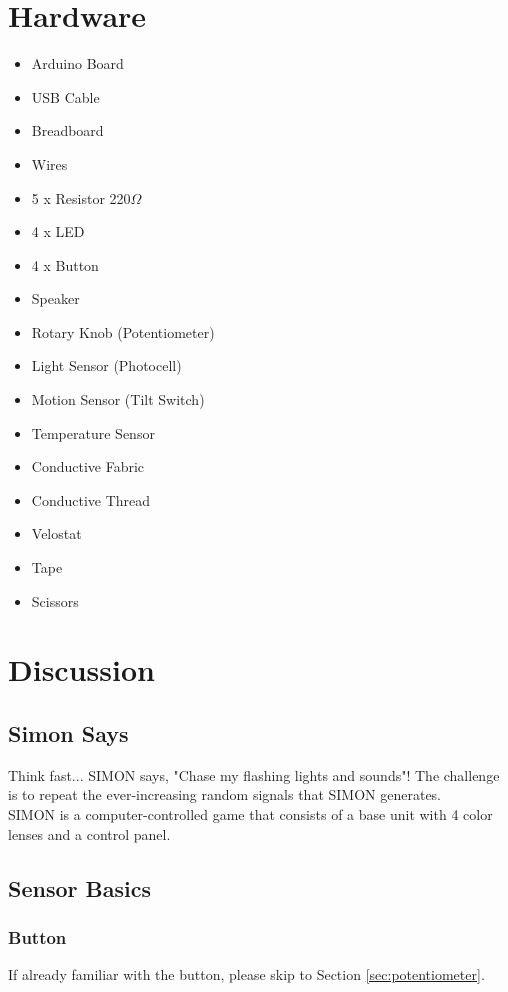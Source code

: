 \documentclass[12pt,letterpaper,oneside]{article}
\begin{document}
\section{Hardware}
		\begin{itemize} \parskip0pt
			\item Arduino Board
			\item USB Cable
			\item Breadboard
			\item Wires
			\item 5 x Resistor 220$\Omega$
			\item 4 x LED
			\item 4 x Button
			\item Speaker
			\item Rotary Knob (Potentiometer)
			\item Light Sensor (Photocell)
			\item Motion Sensor (Tilt Switch)
			\item Temperature Sensor
			\item Conductive Fabric
			\item Conductive Thread
			\item Velostat
			\item Tape
			\item Scissors
		\end{itemize}

\section{Discussion}

	\subsection{Simon Says} \label{sec:simon}
Think fast... SIMON says, "Chase my flashing lights and sounds"! The challenge is to repeat the ever-increasing random signals that SIMON generates.\bigskip
\\SIMON is a computer-controlled game that consists of a base unit with 4 color lenses and a control panel.

	\subsection{Sensor Basics}	
			\subsubsection{Button}
			If already familiar with the button, please skip to Section \ref{sec:potentiometer}. 
\end{document}
